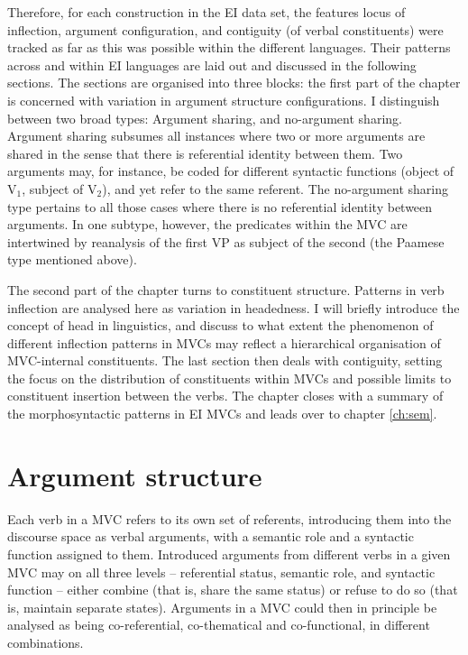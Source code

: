 Therefore, for each construction in the EI data set, the features locus of inflection, argument configuration, and contiguity (of verbal constituents) were tracked as far as this was possible within the different languages. Their patterns across and within EI languages are laid out and discussed in the following sections. The sections are organised into three blocks: the first part of the chapter is concerned with variation in argument structure configurations. I distinguish between two broad types: Argument sharing, and no-argument sharing. Argument sharing subsumes all instances where two or more arguments are shared in the sense that there is referential identity between them. Two arguments may, for instance, be coded for different syntactic functions (object of V$_1$, subject of V$_2$), and yet refer to the same referent. The no-argument sharing type pertains to all those cases where there is no referential identity between arguments. In one subtype, however, the predicates within the MVC are intertwined by reanalysis of the first VP as subject of the second (the Paamese type mentioned above).

The second part of the chapter turns to constituent structure. Patterns in verb inflection are analysed here as variation in headedness. I will briefly introduce the concept of head in linguistics, and discuss to what extent the phenomenon of different inflection patterns in MVCs may reflect a hierarchical organisation of MVC-internal constituents. The last section then deals with contiguity, setting the focus on the distribution of constituents within MVCs and possible limits to constituent insertion between the verbs. The chapter closes with a summary of the morphosyntactic patterns in EI MVCs and leads over to chapter \ref{ch:sem}.

\section{Argument structure}\label{sec:argumentstructure}

Each verb in a MVC refers to its own set of referents, introducing them into the discourse space as verbal arguments, with a semantic role and a syntactic function assigned to them. Introduced arguments from different verbs in a given MVC may on all three levels -- referential status, semantic role, and syntactic function -- either combine (that is, share the same status) or refuse to do so (that is, maintain separate states). Arguments in a MVC could then in principle be analysed as being co-referential, co-thematical and co-functional, in different combinations. 

